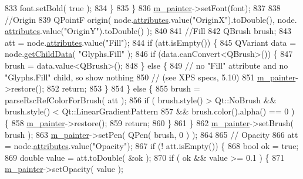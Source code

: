 \begin{DoxyCode}
833             font.setBold( \textcolor{keyword}{true} );
834         \}
835     \}
836     \hyperlink{classXpsHandler_a2db77df5312274e6f1d7e274b45c9d21}{m\_painter}->setFont(font);
837 
838     \textcolor{comment}{//Origin}
839     QPointF origin( node.\hyperlink{classXpsRenderNode_a7f6fca2e06dd119e7eb20139af6c8477}{attributes}.value(\textcolor{stringliteral}{"OriginX"}).toDouble(), node.
      \hyperlink{classXpsRenderNode_a7f6fca2e06dd119e7eb20139af6c8477}{attributes}.value(\textcolor{stringliteral}{"OriginY"}).toDouble() );
840 
841     \textcolor{comment}{//Fill}
842     QBrush brush;
843     att = node.\hyperlink{classXpsRenderNode_a7f6fca2e06dd119e7eb20139af6c8477}{attributes}.value(\textcolor{stringliteral}{"Fill"});
844     \textcolor{keywordflow}{if} (att.isEmpty()) \{
845         QVariant data = node.\hyperlink{classXpsRenderNode_a7b201a5c93024bcb63ebb6e913a010f8}{getChildData}( \textcolor{stringliteral}{"Glyphs.Fill"} );
846         \textcolor{keywordflow}{if} (data.canConvert<QBrush>()) \{
847             brush = data.value<QBrush>();
848         \} \textcolor{keywordflow}{else} \{
849             \textcolor{comment}{// no "Fill" attribute and no "Glyphs.Fill" child, so show nothing}
850             \textcolor{comment}{// (see XPS specs, 5.10)}
851             \hyperlink{classXpsHandler_a2db77df5312274e6f1d7e274b45c9d21}{m\_painter}->restore();
852             \textcolor{keywordflow}{return};
853         \}
854     \} \textcolor{keywordflow}{else} \{
855         brush = parseRscRefColorForBrush( att );
856         \textcolor{keywordflow}{if} ( brush.style() > Qt::NoBrush && brush.style() < Qt::LinearGradientPattern
857              && brush.color().alpha() == 0 ) \{
858             \hyperlink{classXpsHandler_a2db77df5312274e6f1d7e274b45c9d21}{m\_painter}->restore();
859             \textcolor{keywordflow}{return};
860         \}
861     \}
862     \hyperlink{classXpsHandler_a2db77df5312274e6f1d7e274b45c9d21}{m\_painter}->setBrush( brush );
863     \hyperlink{classXpsHandler_a2db77df5312274e6f1d7e274b45c9d21}{m\_painter}->setPen( QPen( brush, 0 ) );
864 
865     \textcolor{comment}{// Opacity}
866     att = node.\hyperlink{classXpsRenderNode_a7f6fca2e06dd119e7eb20139af6c8477}{attributes}.value(\textcolor{stringliteral}{"Opacity"});
867     \textcolor{keywordflow}{if} (! att.isEmpty()) \{
868         \textcolor{keywordtype}{bool} ok = \textcolor{keyword}{true};
869         \textcolor{keywordtype}{double} value = att.toDouble( &ok );
870         \textcolor{keywordflow}{if} ( ok && value >= 0.1 ) \{
871             \hyperlink{classXpsHandler_a2db77df5312274e6f1d7e274b45c9d21}{m\_painter}->setOpacity( value );

\end{DoxyCode}
